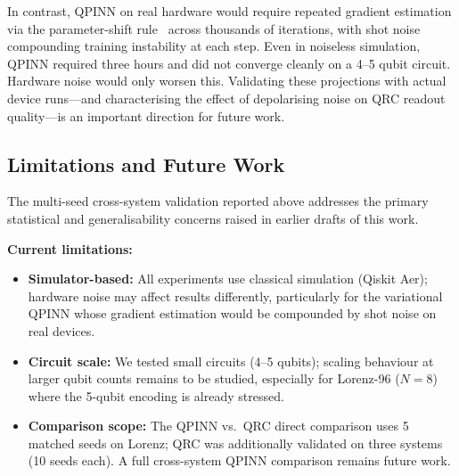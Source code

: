 \documentclass[11pt,a4paper]{article}
\begin{document}
In contrast, QPINN on real hardware would require repeated gradient estimation
via the parameter-shift rule~\cite{mitarai2018quantum} across thousands of
iterations, with shot noise compounding training instability at each step.
Even in noiseless simulation, QPINN required three hours and did not converge
cleanly on a 4--5 qubit circuit.
Hardware noise would only worsen this.
Validating these projections with actual device runs---and characterising the
effect of depolarising noise on QRC readout quality---is an important direction
for future work.

\subsection{Limitations and Future Work}
\label{sec:limitations}

The multi-seed cross-system validation reported above addresses the primary
statistical and generalisability concerns raised in earlier drafts of this
work.

\textbf{Current limitations:}
\begin{itemize}
    \item \textbf{Simulator-based:} All experiments use classical simulation (Qiskit Aer); hardware noise may affect results differently, particularly for the variational QPINN whose gradient estimation would be compounded by shot noise on real devices.
    \item \textbf{Circuit scale:} We tested small circuits (4--5 qubits); scaling behaviour at larger qubit counts remains to be studied, especially for Lorenz-96 ($N=8$) where the 5-qubit encoding is already stressed.
    \item \textbf{Comparison scope:} The QPINN vs.\ QRC direct comparison uses 5 matched seeds on Lorenz; QRC was additionally validated on three systems (10 seeds each). A full cross-system QPINN comparison remains future work.
\end{itemize}
\end{document}
